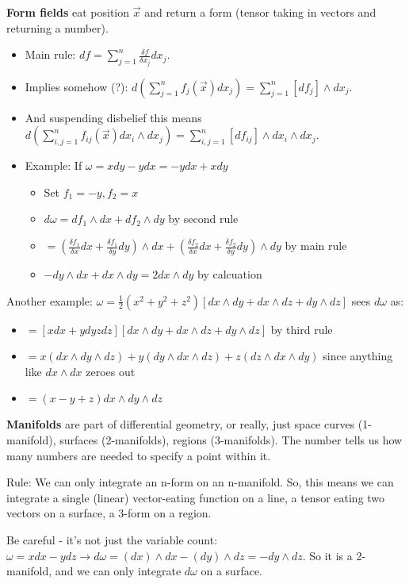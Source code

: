 \documentclass[11pt, oneside]{article}   	%
\begin{document}
\textbf{Form fields} eat position $\vec{x}$ and return a form (tensor taking in vectors and returning a number).
\begin{itemize}
\item Main rule: $df = \sum_{j=1}^n \frac{\delta f}{\delta x_j} dx_j$.
\item Implies somehow (?): $d( \sum_{j=1}^n f_j(\vec{x})dx_j) = \sum_{j=1}^n [df_j] \wedge dx_j$.
\item And suspending disbelief this means $d( \sum_{i,j=1}^n f_{ij}(\vec{x})dx_i \wedge dx_j ) = \sum_{i,j=1}^n [df_{ij}] \wedge dx_i \wedge dx_j$.
\item Example: If $\omega = x dy - y dx = -y dx + x dy$
\begin{itemize}
\item Set $f_1  = -y, f_2 = x$
\item $d\omega = df_1 \wedge dx + df_2 \wedge dy$ by second rule
\item $=(\frac{\delta f_1}{\delta x} dx + \frac{\delta f_1}{\delta y} dy) \wedge dx + (\frac{\delta f_2}{\delta x} dx + \frac{\delta f_2}{\delta y} dy) \wedge dy$ by main rule
\item $-dy \wedge dx + dx \wedge dy = 2dx \wedge dy$ by calcuation
\end{itemize}
\end{itemize}

Another example: $\omega = \frac{1}{2}(x^2+y^2+z^2)[dx\wedge dy + dx\wedge dz + dy\wedge dz]$ sees $d\omega$ as:
\begin{itemize}
\item $=[x dx + y dy z dz] [dx\wedge dy + dx\wedge dz + dy\wedge dz]$ by third rule
\item $=x (dx \wedge dy \wedge dz) + y (dy \wedge dx \wedge dz )+ z (dz \wedge dx \wedge dy)$ since anything like $dx \wedge dx$ zeroes out
\item $=(x - y + z) dx \wedge dy \wedge dz $ 
\end{itemize}

\textbf{Manifolds} are part of differential geometry, or really, just space curves (1-manifold), surfaces (2-manifolds), regions (3-manifolds).  The number tells us how many numbers are needed to specify a point within it.

Rule: We can only integrate an n-form on an n-manifold.  So, this means we can integrate a single (linear) vector-eating function on a line, a tensor eating two vectors on a surface, a 3-form on a region.

Be careful - it's not just the variable count: $\omega = x dx - y dz \rightarrow d\omega = (dx) \wedge dx - (dy) \wedge dz = -dy \wedge dz$.  So it is a 2-manifold, and we can only integrate $d\omega$ on a surface.
\end{document}

